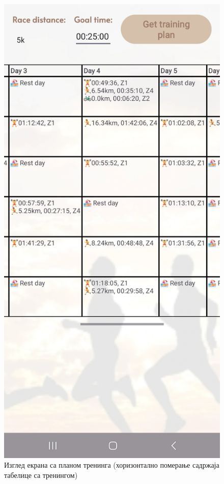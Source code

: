 \documentclass[12pt,oneside]{memoir}
\begin{document}
\begin{figure}[h]
\begin{minipage}{0.23\textwidth}
  \end{minipage}
    \hfill
  \begin{minipage}{0.23\textwidth}
    \centering
    \includegraphics[width=\textwidth]{assets/pictures/app_screenshots/training_plan_3.jpg}
  \end{minipage}
  \caption{Изглед екрана са планом тренинга (хоризонтално померање садржаја табелице са тренингом)}
  \label{pic:training_plan}
\end{figure}
\end{document}
